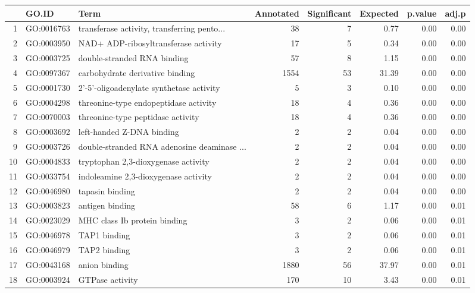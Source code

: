 \begin{table}[ht]
\centering
\begin{tabular}{rllrrrrr}
  \hline
 & GO.ID & Term & Annotated & Significant & Expected & p.value & adj.p \\ 
  \hline
1 & GO:0016763 & transferase activity, transferring pento... &  38 &   7 & 0.77 & 0.00 & 0.00 \\ 
  2 & GO:0003950 & NAD+ ADP-ribosyltransferase activity &  17 &   5 & 0.34 & 0.00 & 0.00 \\ 
  3 & GO:0003725 & double-stranded RNA binding &  57 &   8 & 1.15 & 0.00 & 0.00 \\ 
  4 & GO:0097367 & carbohydrate derivative binding & 1554 &  53 & 31.39 & 0.00 & 0.00 \\ 
  5 & GO:0001730 & 2'-5'-oligoadenylate synthetase activity &   5 &   3 & 0.10 & 0.00 & 0.00 \\ 
  6 & GO:0004298 & threonine-type endopeptidase activity &  18 &   4 & 0.36 & 0.00 & 0.00 \\ 
  7 & GO:0070003 & threonine-type peptidase activity &  18 &   4 & 0.36 & 0.00 & 0.00 \\ 
  8 & GO:0003692 & left-handed Z-DNA binding &   2 &   2 & 0.04 & 0.00 & 0.00 \\ 
  9 & GO:0003726 & double-stranded RNA adenosine deaminase ... &   2 &   2 & 0.04 & 0.00 & 0.00 \\ 
  10 & GO:0004833 & tryptophan 2,3-dioxygenase activity &   2 &   2 & 0.04 & 0.00 & 0.00 \\ 
  11 & GO:0033754 & indoleamine 2,3-dioxygenase activity &   2 &   2 & 0.04 & 0.00 & 0.00 \\ 
  12 & GO:0046980 & tapasin binding &   2 &   2 & 0.04 & 0.00 & 0.00 \\ 
  13 & GO:0003823 & antigen binding &  58 &   6 & 1.17 & 0.00 & 0.01 \\ 
  14 & GO:0023029 & MHC class Ib protein binding &   3 &   2 & 0.06 & 0.00 & 0.01 \\ 
  15 & GO:0046978 & TAP1 binding &   3 &   2 & 0.06 & 0.00 & 0.01 \\ 
  16 & GO:0046979 & TAP2 binding &   3 &   2 & 0.06 & 0.00 & 0.01 \\ 
  17 & GO:0043168 & anion binding & 1880 &  56 & 37.97 & 0.00 & 0.01 \\ 
  18 & GO:0003924 & GTPase activity & 170 &  10 & 3.43 & 0.00 & 0.01 \\ 

\end{tabular}
\end{table}
